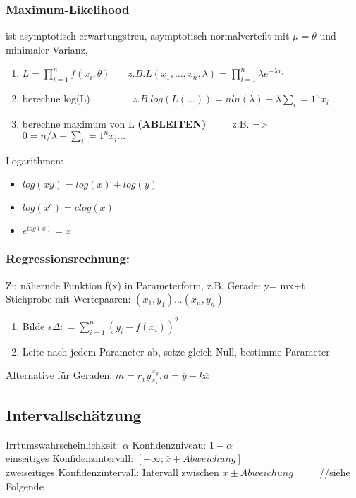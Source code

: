 \subsubsection*{Maximum-Likelihood}
ist asymptotisch erwartungstreu, asymptotisch normalverteilt mit $\mu = \theta$ und minimaler Varianz, 
\begin{enumerate}
\item $L = \prod_{i=1}^n f(x_i,\theta)  ~~~~~~~~z.B. L(x_1,\dots,x_n,\lambda) = \prod_{i=1}^n \lambda e^ {-\lambda x_i}$
\item berechne log(L) 	~~~~~~~~$	z.B. log(L(\dots)) = n ln(\lambda) -\lambda \sum_i=1^n x_i $
\item berechne maximum von L \textbf{(ABLEITEN)} ~~~~ z.B.  => $0 = n/\lambda - \sum_i=1^n x_i \dots$
\end{enumerate}

Logarithmen:
\begin{itemize}
\item $log(xy) = log(x) + log(y)$
\item $log(x^c) = clog(x)$
\item $e^{log(x)} = x$
\end{itemize}

\subsubsection*{Regressionsrechnung:}
Zu nähernde Funktion f(x) in Parameterform, z.B. Gerade: y= mx+t\\
Stichprobe mit Wertepaaren: $(x_1,y_1)\dots (x_n,y_n)$

\begin{enumerate}
\item Bilde s$\Delta : = \sum_{i=1}^n(y_i - f(x_i))^2$\\
\item Leite nach jedem Parameter ab, setze gleich Null, bestimme Parameter
\end{enumerate}

Alternative für Geraden: $m= r_xy\frac{x_y}{s_x}, d = \overline{y}-k\overline{x}$

\subsection*{Intervallschätzung}
Irrtumswahrscheinlichkeit: $\alpha$ 
Konfidenzniveau: $1-\alpha$\\
einseitiges Konfidenzintervall: $[-\infty; \overline{x} + Abweichung]$\\
zweiseitiges Konfidenzintervall: Intervall zwischen $\overline{x} \pm Abweichung$ ~~~~ //siehe Folgende

